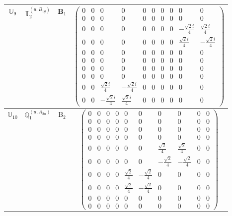\documentclass[fleqn,10pt,landscape]{article}
\begin{document}
\begin{itemize}
\begin{center}
\begin{longtable}{c|c|c|c}
$ \mathbb{U}_{9} $ & $\mathbb{T}_{2}^{(u,B_{1g})}$ & B$_{1}$ & $\begin{pmatrix} 0 & 0 & 0 & 0 & 0 & 0 & 0 & 0 & 0 & 0 \\ 0 & 0 & 0 & 0 & 0 & 0 & 0 & 0 & 0 & 0 \\ 0 & 0 & 0 & 0 & 0 & 0 & 0 & 0 & - \frac{\sqrt{2} i}{4} & \frac{\sqrt{2} i}{4} \\ 0 & 0 & 0 & 0 & 0 & 0 & 0 & 0 & \frac{\sqrt{2} i}{4} & - \frac{\sqrt{2} i}{4} \\ 0 & 0 & 0 & 0 & 0 & 0 & 0 & 0 & 0 & 0 \\ 0 & 0 & 0 & 0 & 0 & 0 & 0 & 0 & 0 & 0 \\ 0 & 0 & 0 & 0 & 0 & 0 & 0 & 0 & 0 & 0 \\ 0 & 0 & 0 & 0 & 0 & 0 & 0 & 0 & 0 & 0 \\ 0 & 0 & \frac{\sqrt{2} i}{4} & - \frac{\sqrt{2} i}{4} & 0 & 0 & 0 & 0 & 0 & 0 \\ 0 & 0 & - \frac{\sqrt{2} i}{4} & \frac{\sqrt{2} i}{4} & 0 & 0 & 0 & 0 & 0 & 0 \end{pmatrix}$ \\ \hline
$ \mathbb{U}_{10} $ & $\mathbb{Q}_{1}^{(u,A_{2u})}$ & B$_{2}$ & $\begin{pmatrix} 0 & 0 & 0 & 0 & 0 & 0 & 0 & 0 & 0 & 0 \\ 0 & 0 & 0 & 0 & 0 & 0 & 0 & 0 & 0 & 0 \\ 0 & 0 & 0 & 0 & 0 & 0 & 0 & 0 & 0 & 0 \\ 0 & 0 & 0 & 0 & 0 & 0 & 0 & 0 & 0 & 0 \\ 0 & 0 & 0 & 0 & 0 & 0 & \frac{\sqrt{2}}{4} & \frac{\sqrt{2}}{4} & 0 & 0 \\ 0 & 0 & 0 & 0 & 0 & 0 & - \frac{\sqrt{2}}{4} & - \frac{\sqrt{2}}{4} & 0 & 0 \\ 0 & 0 & 0 & 0 & \frac{\sqrt{2}}{4} & - \frac{\sqrt{2}}{4} & 0 & 0 & 0 & 0 \\ 0 & 0 & 0 & 0 & \frac{\sqrt{2}}{4} & - \frac{\sqrt{2}}{4} & 0 & 0 & 0 & 0 \\ 0 & 0 & 0 & 0 & 0 & 0 & 0 & 0 & 0 & 0 \\ 0 & 0 & 0 & 0 & 0 & 0 & 0 & 0 & 0 & 0 \end{pmatrix}$ \\

\end{longtable}
\end{center}
\end{itemize}
\end{document}
